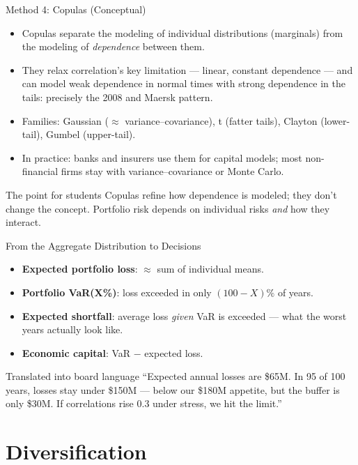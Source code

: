 \documentclass[11pt, aspectratio=169]{beamer}
\begin{document}
\begin{frame}{Method 4: Copulas (Conceptual)}
\begin{itemize}
  \item Copulas separate the modeling of individual distributions (marginals) from the modeling of \emph{dependence} between them.
  \item They relax correlation's key limitation --- linear, constant dependence --- and can model weak dependence in normal times with strong dependence in the tails: precisely the 2008 and Maersk pattern.
  \item Families: Gaussian ($\approx$ variance--covariance), t (fatter tails), Clayton (lower-tail), Gumbel (upper-tail).
  \item In practice: banks and insurers use them for capital models; most non-financial firms stay with variance--covariance or Monte Carlo.
\end{itemize}
\medskip
\begin{block}{The point for students}
Copulas refine how dependence is modeled; they don't change the concept. Portfolio risk depends on individual risks \emph{and} how they interact.
\end{block}
\end{frame}

\begin{frame}{From the Aggregate Distribution to Decisions}
\begin{itemize}
  \item \textbf{Expected portfolio loss}: $\approx$ sum of individual means.
  \item \textbf{Portfolio VaR(X\%)}: loss exceeded in only $(100-X)\%$ of years.
  \item \textbf{Expected shortfall}: average loss \emph{given} VaR is exceeded --- what the worst years actually look like.
  \item \textbf{Economic capital}: VaR $-$ expected loss.
\end{itemize}
\medskip
\begin{block}{Translated into board language}
``Expected annual losses are \$65M. In 95 of 100 years, losses stay under \$150M --- below our \$180M appetite, but the buffer is only \$30M. If correlations rise 0.3 under stress, we hit the limit.''
\end{block}
\end{frame}

\section{Diversification}
\end{document}
